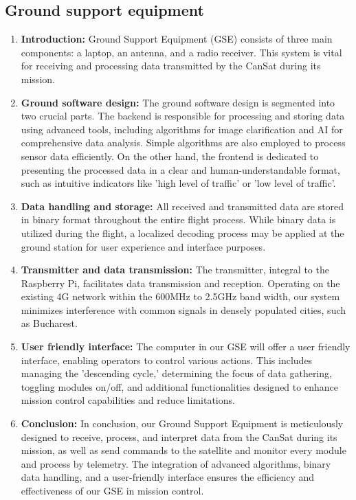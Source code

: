 \documentclass[11pt]{article}
\begin{document}
\subsection{Ground support equipment}
\begin{enumerate}
\item \textbf{Introduction:} {Ground Support Equipment (GSE) consists of three main components: a laptop, an antenna, and a radio receiver. This system is vital for receiving and processing data transmitted by the CanSat during its mission.}
\item \textbf{Ground software design:} {The ground software design is segmented into two crucial parts. The backend is responsible for processing and storing data using advanced tools, including algorithms for image clarification and AI for comprehensive data analysis. Simple algorithms are also employed to process sensor data efficiently. On the other hand, the frontend is dedicated to presenting the processed data in a clear and human-understandable format, such as intuitive indicators like 'high level of traffic' or 'low level of traffic'.}
\item \textbf{Data handling and storage:} {All received and transmitted data are stored in binary format throughout the entire flight process. While binary data is utilized during the flight, a localized decoding process may be applied at the ground station for user experience and interface purposes.}
\item \textbf{Transmitter and data transmission:} {The transmitter, integral to the Raspberry Pi, facilitates data transmission and reception. Operating on the existing 4G network within the 600MHz to 2.5GHz band width, our system minimizes interference with common signals in densely populated cities, such as Bucharest.}
\item \textbf{User friendly interface:} {The computer in our GSE will offer a user friendly interface, enabling operators to control various actions. This includes managing the 'descending cycle,' determining the focus of data gathering, toggling modules on/off, and additional functionalities designed to enhance mission control capabilities and reduce limitations.}
\item \textbf{Conclusion:} {In conclusion, our Ground Support Equipment is meticulously designed to receive, process, and interpret data from the CanSat during its mission, as well as send commands to the satellite and monitor every module and process by telemetry. The integration of advanced algorithms, binary data handling, and a user-friendly interface ensures the efficiency and effectiveness of our GSE in mission control.}
\end{enumerate}
\end{document}
